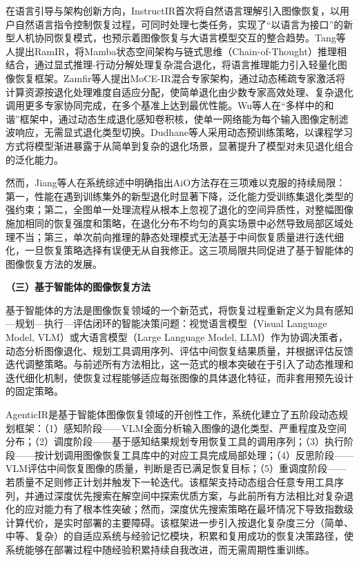 在语言引导与架构创新方向，InstructIR\cite{instructir}首次将自然语言理解引入图像恢复，以用户自然语言指令控制恢复过程，可同时处理七类任务，实现了“以语言为接口”的新型人机协同恢复模式，也预示着图像恢复与大语言模型交互的整合趋势。Tang等人\cite{ramir}提出RamIR，将Mamba状态空间架构与链式思维（Chain-of-Thought）推理相结合，通过显式推理-行动分解处理复杂混合退化，将语言推理能力引入轻量化图像恢复框架。Zamfir等人\cite{moce_ir}提出MoCE-IR混合专家架构，通过动态稀疏专家激活将计算资源按退化处理难度自适应分配，使简单退化由少数专家高效处理、复杂退化调用更多专家协同完成，在多个基准上达到最优性能。Wu等人\cite{wu2024harmony}在“多样中的和谐”框架中，通过动态生成退化感知卷积核，使单一网络能为每个输入图像定制滤波响应，无需显式退化类型切换。Dudhane等人\cite{dudhane2024}采用动态预训练策略，以课程学习方式将模型渐进暴露于从简单到复杂的退化场景，显著提升了模型对未见退化组合的泛化能力。

然而，Jiang等人\cite{aio_survey}在系统综述中明确指出AiO方法存在三项难以克服的持续局限：第一，性能在遇到训练集外的新型退化时显著下降，泛化能力受训练集退化类型的强约束；第二，全图单一处理流程从根本上忽视了退化的空间异质性，对整幅图像施加相同的恢复强度和策略，在退化分布不均匀的真实场景中必然导致局部区域处理不当；第三，单次前向推理的静态处理模式无法基于中间恢复质量进行迭代细化，一旦恢复策略选择有误便无从自我修正。这三项局限共同促进了基于智能体的图像恢复方法的发展。

\textbf{（三）基于智能体的图像恢复方法}

基于智能体的方法是图像恢复领域的一个新范式，将恢复过程重新定义为具有感知---规划---执行---评估闭环的智能决策问题：视觉语言模型（Visual Language Model, VLM）或大语言模型（Large Language Model, LLM）作为协调决策者，动态分析图像退化、规划工具调用序列、评估中间恢复结果质量，并根据评估反馈迭代调整策略。与前述所有方法相比，这一范式的根本突破在于引入了动态推理和迭代细化机制，使恢复过程能够适应每张图像的具体退化特征，而非套用预先设计的固定策略。

AgenticIR\cite{agenticir}是基于智能体图像恢复领域的开创性工作，系统化建立了五阶段动态规划框架：（1）感知阶段——VLM全面分析输入图像的退化类型、严重程度及空间分布；（2）调度阶段——基于感知结果规划专用恢复工具的调用序列；（3）执行阶段——按计划调用图像恢复工具库中的对应工具完成局部处理；（4）反思阶段——VLM评估中间恢复图像的质量，判断是否已满足恢复目标；（5）重调度阶段——若质量不足则修正计划并触发下一轮迭代。该框架支持动态组合任意专用工具序列，并通过深度优先搜索在解空间中探索优质方案，与此前所有方法相比对复杂退化的应对能力有了根本性突破；然而，深度优先搜索策略在最坏情况下导致指数级计算代价，是实时部署的主要障碍。该框架进一步引入按退化复杂度三分（简单、中等、复杂）的自适应系统与经验记忆模块，积累和复用成功的恢复决策路径，使系统能够在部署过程中随经验积累持续自我改进，而无需周期性重训练。


